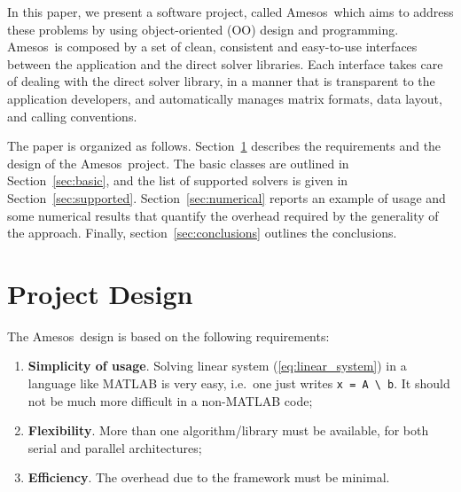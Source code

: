 \documentclass{llncs}
\newcommand{\amesos}{{\sc Amesos}}
\begin{document}
In this paper, we present a software project, called \amesos\, which aims to
address these problems by using object-oriented (OO) design and programming.
\amesos\ is composed by a set of clean, consistent and easy-to-use interfaces
between the application and the direct solver libraries.  Each interface takes
care of dealing with the direct solver library, in a manner that is
transparent to the application developers, and automatically manages matrix
formats, data layout, and calling conventions. \smallskip

\smallskip

The paper is organized as follows. Section~\ref{sec:design} describes the
requirements and the design of the \amesos\ project. The basic classes are
outlined in Section~\ref{sec:basic}, and the list of supported solvers is
given in Section~\ref{sec:supported}.  Section~\ref{sec:numerical} reports an
example of usage and some numerical results that quantify the overhead
required by the generality of the approach.  Finally,
section~\ref{sec:conclusions} outlines the conclusions.

\section{Project Design}
\label{sec:design}

The \amesos\ design is based on the following requirements:
\begin{enumerate}
%
\item {\bf Simplicity of usage}. Solving linear system (\ref{eq:linear_system}) in a language
like MATLAB is very easy, i.e.~one just writes \verb!x = A \ b!. It should not be much
more difficult in a non-MATLAB code;
%
\item {\bf Flexibility}. More than one algorithm/library must be available,
  for both serial and parallel architectures;
%
\item {\bf Efficiency}. The overhead due to the framework must be minimal.
\end{enumerate}
\end{document}
